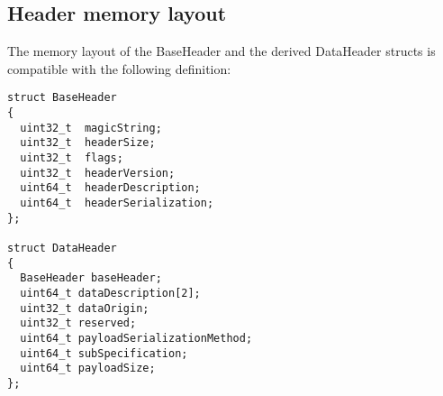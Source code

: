 \documentclass[a4paper,twoside]{article}
\begin{document}
\subsection{Header memory layout}
The memory layout of the BaseHeader and the derived DataHeader structs is compatible with the following definition:

\lstset{language=C++
}
\begin{lstlisting}
struct BaseHeader
{
  uint32_t  magicString;
  uint32_t  headerSize;
  uint32_t  flags;
  uint32_t  headerVersion;
  uint64_t  headerDescription;
  uint64_t  headerSerialization;
};

struct DataHeader
{
  BaseHeader baseHeader;
  uint64_t dataDescription[2];
  uint32_t dataOrigin;
  uint32_t reserved;
  uint64_t payloadSerializationMethod;
  uint64_t subSpecification;
  uint64_t payloadSize;
};

\end{lstlisting}
\end{document}
